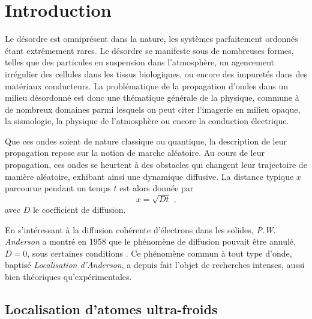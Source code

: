 
\chapter*{Introduction}

Le désordre est omniprésent dans la nature, les systèmes parfaitement ordonnés étant extrêmement rares. Le désordre se manifeste sous de nombreuses formes, telles que des particules en suspension dans l'atmosphère, un agencement irrégulier des cellules dans les tissus biologiques, ou encore des impuretés dans des matériaux conducteurs. La problématique de la propagation d'ondes dans un milieu désordonné est donc une thématique générale de la physique, commune à de nombreux domaines parmi lesquels on peut citer l'imagerie en milieu opaque, la sismologie, la physique de l'atmosphère ou encore la conduction électrique. 

Que ces ondes soient de nature classique ou quantique, la description de leur propagation repose sur la notion de marche aléatoire. Au cours de leur propagation, ces ondes se heurtent à des obstacles qui changent leur trajectoire de manière aléatoire, exhibant ainsi une dynamique diffusive. La distance typique $x$ parcourue pendant un temps $t$ est alors donnée par
\begin{equation}
x=\sqrt{Dt} \text{ ,}
\end{equation}
avec $D$ le coefficient de diffusion. 

En s'intéressant à la diffusion cohérente d'électrons dans les solides, \emph{P.W. Anderson} a montré en 1958 que le phénomène de diffusion pouvait être annulé, $D=0$, sous certaines conditions \citep{anderson1958absence}. Ce phénomène commun à tout type d'onde, baptisé \emph{Localisation d'Anderson}, a depuis fait l'objet de recherches intenses, aussi bien théoriques qu'expérimentales. 


\section*{Localisation d'atomes ultra-froids}

